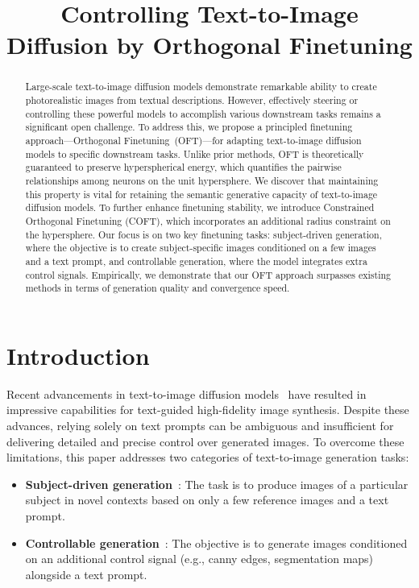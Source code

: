 \title{Controlling Text-to-Image Diffusion by Orthogonal Finetuning}

\begin{abstract}
Large-scale text-to-image diffusion models demonstrate remarkable ability to create photorealistic images from textual descriptions. However, effectively steering or controlling these powerful models to accomplish various downstream tasks remains a significant open challenge. To address this, we propose a principled finetuning approach—Orthogonal Finetuning~(OFT)—for adapting text-to-image diffusion models to specific downstream tasks. Unlike prior methods, OFT is theoretically guaranteed to preserve hyperspherical energy, which quantifies the pairwise relationships among neurons on the unit hypersphere. We discover that maintaining this property is vital for retaining the semantic generative capacity of text-to-image diffusion models. To further enhance finetuning stability, we introduce Constrained Orthogonal Finetuning (COFT), which incorporates an additional radius constraint on the hypersphere. Our focus is on two key finetuning tasks: subject-driven generation, where the objective is to create subject-specific images conditioned on a few images and a text prompt, and controllable generation, where the model integrates extra control signals. Empirically, we demonstrate that our OFT approach surpasses existing methods in terms of generation quality and convergence speed.
\end{abstract}

\section{Introduction}

Recent advancements in text-to-image diffusion models~\cite{saharia2022photorealistic,ramesh2022hierarchical,rombach2022high} have resulted in impressive capabilities for text-guided high-fidelity image synthesis. Despite these advances, relying solely on text prompts can be ambiguous and insufficient for delivering detailed and precise control over generated images. To overcome these limitations, this paper addresses two categories of text-to-image generation tasks:

\begin{itemize}[leftmargin=*,nosep]

    \item \textbf{Subject-driven generation}~\cite{ruiz2023dreambooth}: The task is to produce images of a particular subject in novel contexts based on only a few reference images and a text prompt.
    \item \textbf{Controllable generation}~\cite{zhang2023adding,mou2023t2i}: The objective is to generate images conditioned on an additional control signal (e.g., canny edges, segmentation maps) alongside a text prompt.
\end{itemize}

